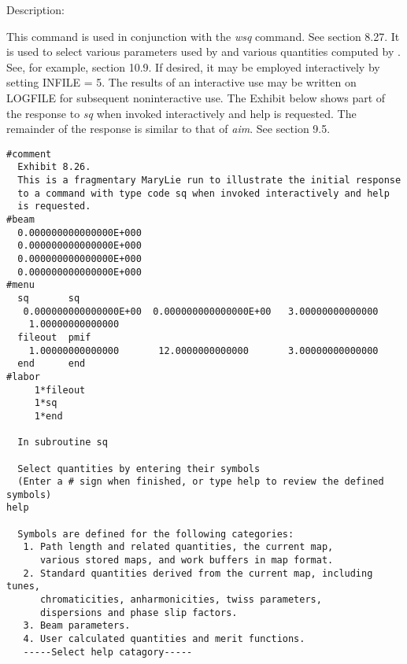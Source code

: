 \vspace{5mm}
     Description:
\vspace{2mm}

This command is used in conjunction with the {\em wsq} command.  See section 8.27.  It is used to select various parameters used by \Mary and various quantities computed by \Mary.  See, for example, section 10.9.  If desired, it may be employed interactively by setting INFILE = 5.  The results of an interactive use may be written on LOGFILE for subsequent noninteractive use.  The Exhibit below shows part of the response to {\em sq} when invoked interactively and help is requested.  The remainder of the response is similar to that of {\em aim}.  See section 9.5.

\vspace{5mm}
\begin{footnotesize}
\begin{verbatim}
#comment
  Exhibit 8.26.
  This is a fragmentary MaryLie run to illustrate the initial response
  to a command with type code sq when invoked interactively and help
  is requested.
#beam
  0.000000000000000E+000
  0.000000000000000E+000
  0.000000000000000E+000
  0.000000000000000E+000
#menu
  sq       sq
   0.000000000000000E+00  0.000000000000000E+00   3.00000000000000
    1.00000000000000
  fileout  pmif
    1.00000000000000       12.0000000000000       3.00000000000000
  end      end
#labor
     1*fileout
     1*sq
     1*end

  In subroutine sq

  Select quantities by entering their symbols
  (Enter a # sign when finished, or type help to review the defined
symbols)
help

  Symbols are defined for the following categories:
   1. Path length and related quantities, the current map,
      various stored maps, and work buffers in map format.
   2. Standard quantities derived from the current map, including tunes,
      chromaticities, anharmonicities, twiss parameters,
      dispersions and phase slip factors.
   3. Beam parameters.
   4. User calculated quantities and merit functions.
   -----Select help catagory-----
\end{verbatim}
\end{footnotesize}

\newpage
